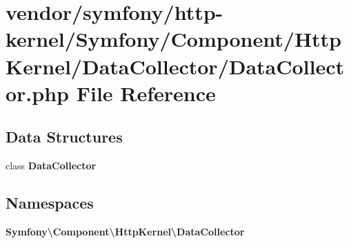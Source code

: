 \section{vendor/symfony/http-\/kernel/\+Symfony/\+Component/\+Http\+Kernel/\+Data\+Collector/\+Data\+Collector.php File Reference}
\label{_data_collector_8php}
\subsection*{Data Structures}
\begin{DoxyCompactItemize}
\item 
class {\bf Data\+Collector}
\end{DoxyCompactItemize}
\subsection*{Namespaces}
\begin{DoxyCompactItemize}
\item 
 {\bf Symfony\textbackslash{}\+Component\textbackslash{}\+Http\+Kernel\textbackslash{}\+Data\+Collector}
\end{DoxyCompactItemize}
